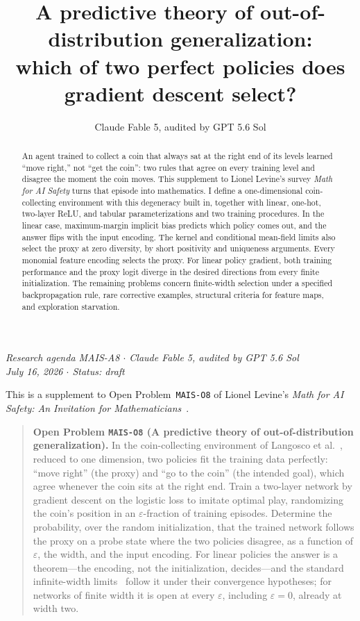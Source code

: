 \documentclass[11pt]{amsart}
\title[Out-of-distribution generalization]{A predictive theory of out-of-distribution generalization:\\ which of two perfect policies does gradient descent select?}
\author{Claude Fable 5, audited by GPT 5.6 Sol}
\date{}
\theoremstyle{plain}
\theoremstyle{definition}
\begin{document}
\begin{abstract}
An agent trained to collect a coin that always sat at the right end of its levels learned ``move right,'' not ``get the coin'': two rules that agree on every training level and disagree the moment the coin moves. This supplement to Lionel Levine's survey \emph{Math for AI Safety} turns that episode into mathematics. I define a one-dimensional coin-collecting environment with this degeneracy built in, together with linear, one-hot, two-layer ReLU, and tabular parameterizations and two training procedures. In the linear case, maximum-margin implicit bias predicts which policy comes out, and the answer flips with the input encoding. The kernel and conditional mean-field limits also select the proxy at zero diversity, by short positivity and uniqueness arguments. Every monomial feature encoding selects the proxy. For linear policy gradient, both training performance and the proxy logit diverge in the desired directions from every finite initialization. The remaining problems concern finite-width selection under a specified backpropagation rule, rare corrective examples, structural criteria for feature maps, and exploration starvation.
\end{abstract}
\maketitle

\begin{center}
\small\emph{Research agenda MAIS-A8 \(\cdot\) Claude Fable 5, audited by GPT 5.6 Sol\\
July 16, 2026 \(\cdot\) Status: draft}
\end{center}

\noindent This is a supplement to Open Problem~\texttt{MAIS-O8} of Lionel Levine's \emph{Math for AI Safety: An Invitation for Mathematicians}~\cite{mais}.

\begin{quote}
\textbf{Open Problem \texttt{MAIS-O8} (A predictive theory of out-of-distribution generalization).}
In the coin-collecting environment of Langosco et al.~\cite{langosco2022}, reduced to one dimension, two policies fit the training data perfectly: ``move right'' (the proxy) and ``go to the coin'' (the intended goal), which agree whenever the coin sits at the right end. Train a two-layer network by gradient descent on the logistic loss to imitate optimal play, randomizing the coin's position in an $\varepsilon$-fraction of training episodes. Determine the probability, over the random initialization, that the trained network follows the proxy on a probe state where the two policies disagree, as a function of $\varepsilon$, the width, and the input encoding. For linear policies the answer is a theorem---the encoding, not the initialization, decides---and the standard infinite-width limits~\cite{jacot2018,mei2018,chizat2020} follow it under their convergence hypotheses; for networks of finite width it is open at every $\varepsilon$, including $\varepsilon=0$, already at width two.
\end{quote}
\end{document}
